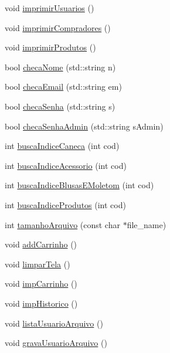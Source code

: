 \begin{DoxyCompactItemize}
\item 
void \hyperlink{class_ecommerce_af6b258758e7486f73d3805838d1a4eda}{imprimir\+Usuarios} ()
\item 
void \hyperlink{class_ecommerce_a91971ec96826e6fd06b8a471c1d2f6c6}{imprimir\+Compradores} ()
\item 
void \hyperlink{class_ecommerce_ae6ec7ab9ef6106cd0aaa1501739b3556}{imprimir\+Produtos} ()
\item 
bool \hyperlink{class_ecommerce_aca3eed60042bb02ac3d3cacb20b86c8d}{checa\+Nome} (std\+::string n)
\item 
bool \hyperlink{class_ecommerce_aefd675a09f348e798fc379f09d265756}{checa\+Email} (std\+::string em)
\item 
bool \hyperlink{class_ecommerce_ac0d4a423c9e3699dcb6f6783b32bdcbd}{checa\+Senha} (std\+::string s)
\item 
bool \hyperlink{class_ecommerce_ad3c6b34226cd0d1ab54ec0e6d82a70be}{checa\+Senha\+Admin} (std\+::string s\+Admin)
\item 
int \hyperlink{class_ecommerce_a7f148dfc9339dfd26b021185e431cd1f}{busca\+Indice\+Caneca} (int cod)
\item 
int \hyperlink{class_ecommerce_ab21ff2a4e6ddd10b01b6cd8e7b8823f8}{busca\+Indice\+Acessorio} (int cod)
\item 
int \hyperlink{class_ecommerce_a99b2d10659b9fe41cc9f5a44cf8a2977}{busca\+Indice\+Blusas\+E\+Moletom} (int cod)
\item 
int \hyperlink{class_ecommerce_af2d514aa14dbca0c0e06337efa7f668a}{busca\+Indice\+Produtos} (int cod)
\item 
int \hyperlink{class_ecommerce_acd1391717ff24f1186ffa2921db5adfe}{tamanho\+Arquivo} (const char $\ast$file\+\_\+name)
\item 
void \hyperlink{class_ecommerce_af2624f7386194d09f7766756f3c08d73}{add\+Carrinho} ()
\item 
void \hyperlink{class_ecommerce_a376670f5f33469721d91663d75810e6a}{limpar\+Tela} ()
\item 
void \hyperlink{class_ecommerce_a3b67b0883dbc411c4ff458d834ded408}{imp\+Carrinho} ()
\item 
void \hyperlink{class_ecommerce_a7c17f28606f64a202842fa9bdfaf9667}{imp\+Historico} ()
\item 
void \hyperlink{class_ecommerce_a0b9df17b27ee437cd1c0349a91fa4de3}{lista\+Usuario\+Arquivo} ()
\item 
void \hyperlink{class_ecommerce_a5a0c013fa9ec62e5529e24286b8424cb}{grava\+Usuario\+Arquivo} ()
\item 

\end{DoxyCompactItemize}
